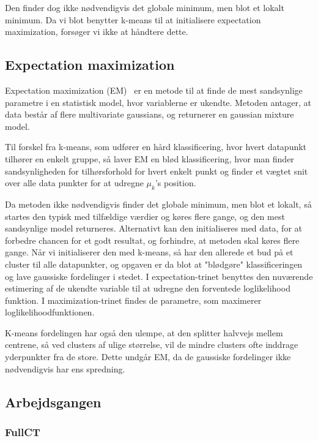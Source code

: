 Den finder dog ikke nødvendigvis det globale minimum, men blot et lokalt
minimum. Da vi blot benytter k-means til at initialisere expectation
maximization, forsøger vi ikke at håndtere dette.

\subsection{Expectation maximization}

Expectation maximization (EM)~\cite{bishop} er en metode til at finde
de mest sandsynlige parametre i en statistisk model, hvor variablerne
er ukendte. Metoden antager, at data består af flere multivariate
gaussians, og returnerer en gaussian mixture model.

Til forskel fra k-means, som udfører en hård klassificering, hvor
hvert datapunkt tilhører en enkelt gruppe, så laver EM en blød
klassificering, hvor man finder sandsynligheden for tilhørsforhold for
hvert enkelt punkt og finder et vægtet snit over alle data punkter for at
udregne $\mu_k$'s position.

Da metoden ikke nødvendigvis finder det globale minimum, men blot et
lokalt, så startes den typisk med tilfældige værdier og køres flere
gange, og den mest sandsynlige model returneres. Alternativt kan den
initialiseres med data, for at forbedre chancen for et godt resultat,
og forhindre, at metoden skal køres flere gange. Når vi initialiserer
den med k-means, så har den allerede et bud på et cluster til alle
datapunkter, og opgaven er da blot at "blødgøre" klassificeringen
og lave gaussiske fordelinger i stedet. I expectation-trinet benyttes
den nuværende estimering af de ukendte variable til at udregne den
forventede loglikelihood funktion. I maximization-trinet findes
de parametre, som maximerer loglikelihoodfunktionen.

K-means fordelingen har også den ulempe, at den splitter halv\-vejs mellem
centrene, så ved clusters af ulige størrelse, vil de mindre clusters ofte
inddrage yderpunkter fra de store. Dette undgår EM, da de gaussiske
fordelinger ikke nødvendigvis har ens spredning.


\subsection{Arbejdsgangen}


\subsubsection{FullCT}

